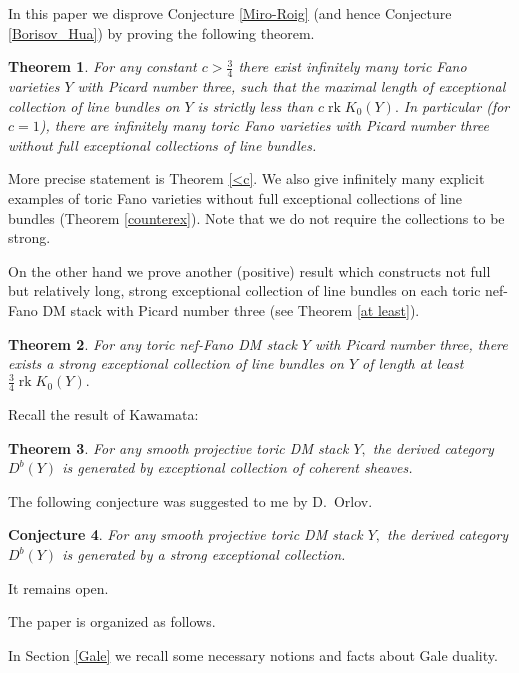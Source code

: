 \documentclass[11pt,leqno]{amsart}
\newtheorem{theo}{Theorem}[section]
\newtheorem{conj}[theo]{Conjecture}
\numberwithin{equation}{section}
\newcommand{\rk}{\operatorname{rk}}
\begin{document}
In this paper we disprove Conjecture \ref{Miro-Roig} (and hence Conjecture \ref{Borisov_Hua}) by proving the following theorem.

\begin{theo}\label{<cintro}For any constant $c>\frac34$ there exist infinitely many toric Fano varieties $Y$ with Picard number three,
such that the maximal length of exceptional collection of line bundles on $Y$ is strictly less than $c\rk K_0(Y).$
In particular (for $c=1$), there are infinitely many toric Fano varieties with Picard number three without full exceptional collections of line bundles.\end{theo}

More precise statement is Theorem \ref{<c}. We also give infinitely many explicit examples of toric Fano varieties
without full exceptional collections of line bundles (Theorem \ref{counterex}). Note that we do not require the collections to be strong.

On the other hand we prove another (positive) result which constructs not full but relatively long, strong exceptional collection of line bundles on each toric nef-Fano DM stack with Picard number three (see Theorem \ref{at least}).

\begin{theo}\label{at_leastintro}For any toric nef-Fano DM stack $Y$ with Picard number three, there exists a strong exceptional collection of line bundles on $Y$
of length at least $\frac34 \rk K_0(Y).$\end{theo}

Recall the result of Kawamata:

\begin{theo}For any smooth projective toric DM stack $Y,$ the derived category $D^b(Y)$ is generated by exceptional collection of coherent sheaves.\end{theo}

The following conjecture was suggested to me by D.~Orlov.

\begin{conj}For any smooth projective toric DM stack $Y,$ the derived category $D^b(Y)$ is generated by a strong exceptional collection.\end{conj}

It remains open.

\smallskip

The paper is organized as follows.

In Section \ref{Gale} we recall some necessary notions and facts about Gale duality.
\end{document}
